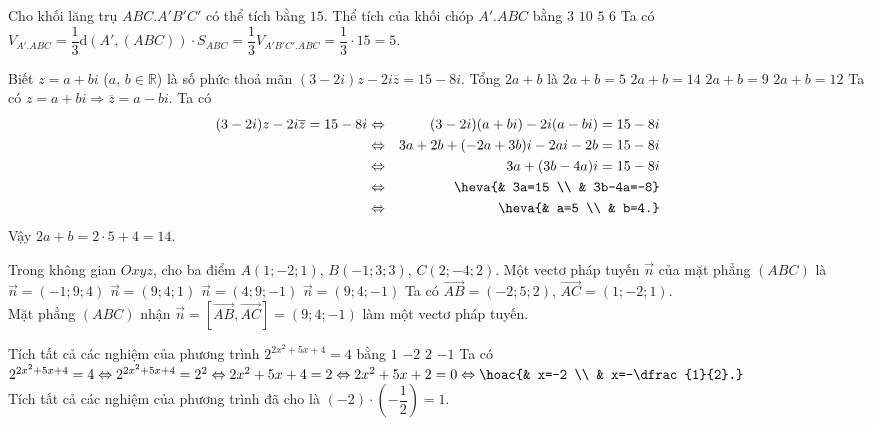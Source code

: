 \begin{ex}%
	Cho khối lăng trụ $ABC.A'B'C'$ có thể tích bằng $15$. Thể tích của khối chóp $A'.ABC$ bằng
	\choice
	{$3$}
	{$10$}
	{\True $5$}
	{$6$}
	\loigiai
	{
		Ta có $V_{A'.ABC}=\dfrac{1}{3}\mathrm{d}(A',(ABC))\cdot S_{ABC}=\dfrac{1}{3}V_{A'B'C'.ABC}=\dfrac{1}{3}\cdot 15=5$.	
	}
\end{ex}

\begin{ex}%
	Biết $z=a+bi$ ($a$, $b\in \mathbb{R}$) là số phức thoả mãn $(3-2i)z-2i\overline{z}=15-8i$. Tổng $2a+b$ là
	\choice
	{$2a+b=5$}
	{\True $2a+b=14$}
	{$2a+b=9$}
	{$2a+b=12$}
	\loigiai
	{
		Ta có $z=a+bi\Rightarrow \overline{z}=a-bi$. Ta có
		\begin{eqnarray*}
			(3-2i)z-2i\overline{z}=15-8i&\Leftrightarrow & (3-2i)(a+bi)-2i(a-bi)=15-8i\\
			&\Leftrightarrow & 3a+2b+(-2a+3b)i-2ai-2b=15-8i\\
			&\Leftrightarrow & 3a+(3b-4a)i=15-8i\\
			&\Leftrightarrow & \heva{& 3a=15 \\ & 3b-4a=-8}\\
			&\Leftrightarrow &\heva{& a=5 \\ & b=4.}
		\end{eqnarray*}
		Vậy $2a+b=2\cdot 5+4=14$.
	}
\end{ex}

\begin{ex}%
	Trong không gian $Oxyz$, cho ba điểm $A(1;-2;1)$, $B(-1;3;3)$, $C(2;-4;2)$. Một vectơ pháp tuyến $\overrightarrow{n}$ của mặt phẳng $(ABC)$ là
	\choice
	{$\overrightarrow{n}=(-1;9;4)$}
	{$\overrightarrow{n}=(9;4;1)$}
	{$\overrightarrow{n}=(4;9;-1)$}
	{\True $\overrightarrow{n}=(9;4;-1)$}
	\loigiai
	{
		Ta có $\overrightarrow{AB}=(-2;5;2)$, $\overrightarrow{AC}=(1;-2;1)$.\\
		Mặt phẳng $(ABC)$ nhận $\overrightarrow{n}=\left[\overrightarrow{AB},\overrightarrow{AC}\right]=(9;4;-1)$ làm một vectơ pháp tuyến.
	}
\end{ex}

\begin{ex}%
	Tích tất cả các nghiệm của phương trình $2^{2x^2+5x+4}=4$ bằng
	\choice
	{\True $1$}
	{$-2$}
	{$2$}
	{$-1$}
	\loigiai
	{
		Ta có $2^{2x^2+5x+4}=4\Leftrightarrow 2^{2x^2+5x+4}=2^2\Leftrightarrow 2x^2+5x+4=2\Leftrightarrow 2x^2+5x+2=0\Leftrightarrow \hoac{& x=-2 \\ & x=-\dfrac{1}{2}.}$\\
		Tích tất cả các nghiệm của phương trình đã cho là $\left(-2\right)\cdot \left(-\dfrac{1}{2}\right)=1$.
	}
\end{ex}

